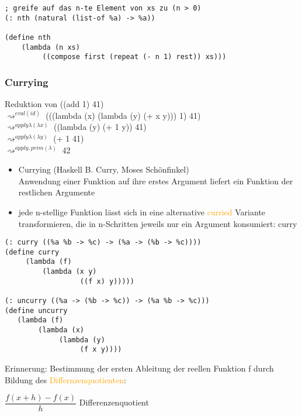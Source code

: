 \documentclass[paper=a4, fontsize=11pt]{scrartcl}
\numberwithin{equation}{section}
\numberwithin{figure}{section}
\numberwithin{table}{section}
\begin{document}
\begin{lstlistig}
\begin{lstlisting}
; greife auf das n-te Element von xs zu (n > 0)
(: nth (natural (list-of %a) -> %a))

(define nth 
    (lambda (n xs)
         ((compose first (repeat (- n 1) rest)) xs)))            
\end{lstlisting}

\subsubsection{Currying}
Reduktion von ((add 1) 41) \\
$\rightsquigarrow^{eval(id)}$ (((lambda (x) (lambda (y) (+ x y))) 1) 41) \\
$\rightsquigarrow^{apply \lambda (\lambda x)}$ ((lambda (y) (+ 1 y)) 41) \\
$\rightsquigarrow^{apply \lambda (\lambda y)}$ (+ 1 41) \\
$\rightsquigarrow^{apply, prim(\lambda)}$ 42


\begin{itemize}
\item Currying (Haskell B. Curry, Moses Schönfinkel) \\
        Anwendung einer Funktion auf ihre erstes Argument liefert ein Funktion der restlichen Argumente 
\item jede n-stellige Funktion lässt sich in eine alternative \textcolor{orange}{curried} Variante transformieren, die in n-Schritten jeweils nur ein Argument konsumiert: curry
\end{itemize}

\begin{lstlisting}
(: curry ((%a %b -> %c) -> (%a -> (%b -> %c))))
(define curry
     (lambda (f)
         (lambda (x y)
                  ((f x) y)))))
                  
(: uncurry ((%a -> (%b -> %c)) -> (%a %b -> %c)))
(define uncurry
   (lambda (f)
        (lambda (x)
             (lambda (y)
                  (f x y))))                
\end{lstlisting}        

Erinnerung: Bestimmung der ersten Ableitung der reellen Funktion f durch Bildung des \textcolor{orange}{Differnzenquotienten}:


$\dfrac{f(x+h)-f(x)}{h}$ Differenzenquotient \\


\end{lstlistig}
\end{document}
